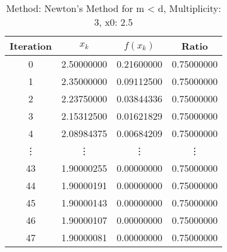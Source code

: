 \begin{table}
\centering
\caption{Method: Newton's Method for m < d, Multiplicity: 3, x0: 2.5}
\label{tab:table_Newton's_Method_for_m_<_d_3_2_5}
\begin{tabular}{c c c c}
\toprule
Iteration &      $x_k$ &   $f(x_k)$ &      Ratio \\
\midrule
        0 & 2.50000000 & 0.21600000 & 0.75000000 \\
        1 & 2.35000000 & 0.09112500 & 0.75000000 \\
        2 & 2.23750000 & 0.03844336 & 0.75000000 \\
        3 & 2.15312500 & 0.01621829 & 0.75000000 \\
        4 & 2.08984375 & 0.00684209 & 0.75000000 \\
   \vdots &     \vdots &     \vdots &     \vdots \\
       43 & 1.90000255 & 0.00000000 & 0.75000000 \\
       44 & 1.90000191 & 0.00000000 & 0.75000000 \\
       45 & 1.90000143 & 0.00000000 & 0.75000000 \\
       46 & 1.90000107 & 0.00000000 & 0.75000000 \\
       47 & 1.90000081 & 0.00000000 & 0.75000000 \\
\bottomrule
\end{tabular}
\end{table}

